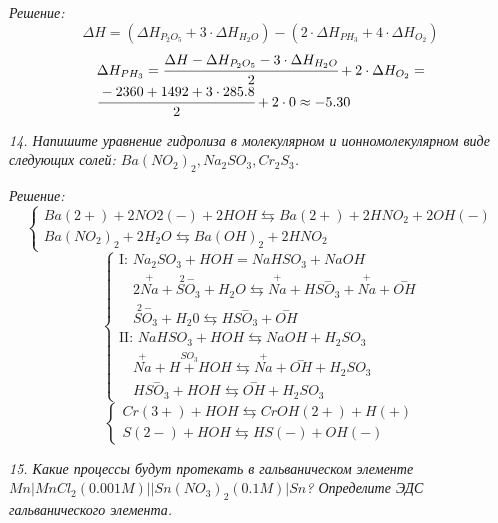 \emph{Решение:}
\[
	\Delta H = \left( \Delta H_{P_2 O_5} + 3\cdot\Delta H_{H_2 O} \right) -
		\left( 2\cdot\Delta H_{PH_3} + 4\cdot\Delta H_{O_2} \right) 
\]
\[
	\begin{array}{ll}
		\Delta H_{PH_3} = \cfrac{ \Delta H - \Delta H_{P_2 O_5} - 
		3\cdot\Delta H_{H_2 O}}{2} + 2\cdot\Delta H_{O_2} = \\
		\cfrac{-2360 + 1492 + 3\cdot285.8}{2} + 2\cdot0 \approx -5.30 
	\end{array}
\]

\pagebreak

\emph{14. Напишите уравнение гидролиза в молекулярном и ионномолекулярном 
виде следующих солей: \( Ba(NO_2)_2, Na_2 SO_3, Cr_2 S_3 \).}

\emph{Решение:}
\[
	\left\{ \begin{array}{ll}
		Ba(2+) + 2NO2(-) + 2HOH \leftrightarrows Ba(2+) + 2HNO_2 + 2OH(-) \\ 
		Ba(NO_2)_2 + 2H_2 O \leftrightarrows Ba(OH)_2 + 2HNO_2
	\end{array} \right.
\]
\[
	\left\{ \begin{array}{ll}
		\text{I: } Na_2 SO_3 + HOH = NaHSO_3 + NaOH \\
		\quad 2\stackrel{+}{Na} + \stackrel{2-}{SO_3} + H_2 O 
			\leftrightarrows \stackrel{+}{Na} + H\stackrel{-}{SO_3} + 
			\stackrel{+}{Na} +  \stackrel{-}{OH} \\
		\quad \stackrel{2-}{SO_3} + H_2 0 \leftrightarrows 
			H\stackrel{-}{SO_3} + \stackrel{-}{OH} \\
		\text{II: } NaHSO_3 + HOH \leftrightarrows NaOH + H_2 SO_3 \\
		\quad \stackrel{+}{Na} + H\stackrel{SO_3} + HOH \leftrightarrows 
			\stackrel{+}{Na} + \stackrel{-}{OH} + H_2 SO_3 \\
		\quad H\stackrel{-}{SO_3} + HOH \leftrightarrows 
			\stackrel{-}{OH} + H_2 SO_3 
	\end{array} \right.
\]
\[
	\left\{ \begin{array}{ll}
		Cr(3+) + HOH \leftrightarrows CrOH(2+) + H(+) \\
		S(2-) + HOH \leftrightarrows HS(-) + OH(-)
	\end{array} \right.
\]

\pagebreak

\emph{15. Какие процессы будут протекать в гальваническом элементе \\
\( Mn \vert MnCl_2(0.001 M) \vert\vert Sn(NO_3)_2(0.1 M) \vert Sn \)? 
Определите ЭДС гальванического элемента.}

